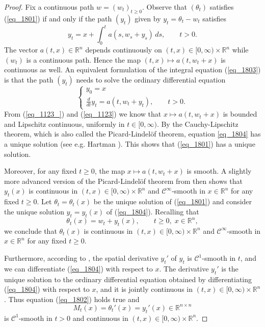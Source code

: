 \documentclass[12pt,a4paper]{article}
\newcommand{\RR}{\mathbb{R}}
\newcommand{\R}{\mathbb{R}}
\theoremstyle{definition}
\begin{document}
\begin{proof} 
Fix a continuous path $w = (w_t)_{t \geq 0}$.
Observe that $(\theta_t)$ satisfies (\ref{eq_1801})
if and only if the path $(y_t)$ given by $y_t = \theta_t - w_t$  satisfies
\begin{equation} \label{eq_1803}
y_t = x + \int_0^t a(s, w_s + y_s) \, ds , \qquad t >0 .
\end{equation}
The vector $a(t,x) \in \RR^n$ depends continuously on $(t,x) \in [0, \infty) \times \RR^n$ while $(w_t)$
is a continuous path. Hence the map $(t,x) \mapsto a(t,w_t +x) $ is
 continuous as well. An equivalent formulation
of the integral equation (\ref{eq_1803}) is that the path $(y_t)$ needs to solve the ordinary differential
equation
\begin{equation} \label{eq_1804}
\begin{cases}
y_0 = x \\
\frac d{dt} y_t = a( t  ,w_t + y_t) , \qquad t > 0 .
\end{cases}
\end{equation}
From (\ref{eq_1123_}) and (\ref{eq_1123}) we know that 
$x \mapsto a(t,w_t+x)$ is bounded and Lipschitz continuous, uniformly in $t \in [0, \infty)$.
By the Cauchy-Lipschitz theorem, which is also called the Picard-Lindel\"of theorem, equation \eqref{eq_1804} has a unique solution
(see e.g. Hartman \cite[Theorem 1.1]{hartman}). This shows that (\ref{eq_1801}) has a unique solution.

\medskip Moreover, for any fixed $t \geq 0$, the map $x\mapsto a(t,w_t+x)$ is smooth. 
A slightly more advanced version of the Picard-Lindel\"of theorem from \cite[Chapter V]{hartman}
then shows that $y_t(x)$ is continuous in $(t,x) \in [0, \infty) \times \RR^n$ and
$\mathcal C^{\infty}$-smooth in $x \in \RR^n$ for any fixed $t \geq 0$. 
Let $\theta_t = \theta_t (x)$ be the unique solution of (\ref{eq_1801}) and consider the unique solution $y_t = y_t(x)$ of (\ref{eq_1804}). Recalling that
$$
\theta_t (x) = w_t + y_t ( x ) , \qquad t \geq 0 ,\; x \in \R^n,
$$ 
we conclude that $\theta_t (x)$ is continuous in $(t,x) \in [0, \infty) \times \RR^n$
and $\mathcal C^{\infty}$-smooth in $x \in \RR^n$ for any fixed $t \geq 0$. 

\medskip Furthermore, according to
 \cite[Theorem 3.1]{hartman}, the spatial derivative $y_t'$ 
of $y_t$ is $\mathcal C^1$-smooth in $t$, and we can differentiate
(\ref{eq_1804}) with respect to $x$. The derivative $y_t'$ is the unique solution to the ordinary 
differential equation obtained by differentiating (\ref{eq_1804}) with respect to $x$,
and it is jointly continuous in $(t,x) \in [0, \infty) \times \RR^n$. Thus equation (\ref{eq_1802})
holds true and $$ M_t(x) = \theta_t'(x) = y_t'(x) \in \RR^{n \times n} $$ is
$\mathcal C^1$-smooth in $t > 0$ and continuous in $(t,x) \in [0, \infty) \times \RR^n$.
\end{proof}
\end{document}
